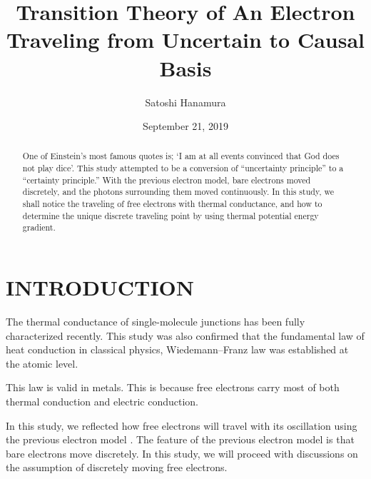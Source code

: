\documentclass[reprint,amsmath,amssymb,aps,]{revtex4-1}
\numberwithin{equation}{section}%
\begin{document}


    \title{Transition Theory of An Electron \\ Traveling from Uncertain to Causal Basis}
    \author{Satoshi Hanamura}
    \date{September 21, 2019}
        \begin{abstract}
        One of Einstein's most famous quotes is; `I am at all events convinced that God does not play dice'. This study attempted to be a conversion of ``uncertainty principle'' to a ``certainty principle.'' With the previous electron model, bare electrons moved discretely, and the photons surrounding them moved continuously. In this study, we shall notice the traveling of free electrons with thermal conductance, and how to determine the unique discrete traveling point by using thermal potential energy gradient.
        \end{abstract}
    \maketitle

\section{\label{sec:INTRODUCTION}INTRODUCTION}


    The thermal conductance of single-molecule junctions has been fully characterized \cite{Pauly} recently. This study was also confirmed that the fundamental law of heat conduction in classical physics, Wiedemann–Franz law was established at the atomic level.

    This law is valid in metals. This is because free electrons carry most of both thermal conduction and electric conduction.
    
    In this study, we reflected how free electrons will travel with its oscillation using the previous electron model \cite{Hanamura1}. The feature of the previous electron model is that bare electrons move discretely. In this study, we will proceed with discussions on the assumption of discretely moving free electrons.
\end{document}
